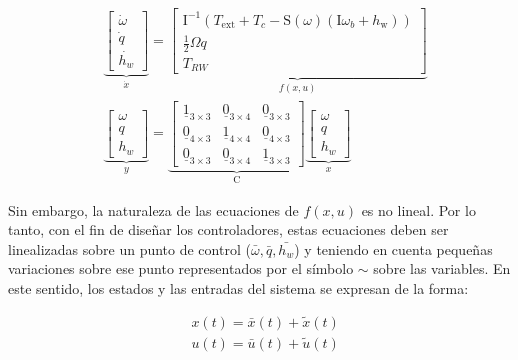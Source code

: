 \begin{equation}\label{eq:espacio_estados_non}
	\begin{aligned}
		& \underbrace{\left[\begin{array}{c}
				\dot{\omega} \\
				\dot{q} \\
				\dot{h_{w}}
			\end{array}\right]}_{\dot{x}}=\underbrace{\left[\begin{array}{c}
				{\mathrm{I}}^{-1}\left(T_{\mathrm{ext}}+T_{c}-{\mathrm{S}}(\omega)\left({\mathrm{I}} \omega_{b}+h_{\mathrm{w}}\right)\right) \\
				\frac{1}{2} {\Omega} q \\
				T_{RW}
			\end{array}\right]}_{f(x,u)}\\[10pt]
		& \underbrace{\left[\begin{array}{c}
				\omega \\
				q \\
				h_{w}
			\end{array}\right]}_y=\underbrace{\left[\begin{array}{ccc}
				\underline{1}_{3 \times 3} & \underline{0}_{3 \times 4} & \underline{0}_{3 \times 3}\\
				\underline{0}_{4 \times 3} & \underline{1}_{4 \times 4} & \underline{0}_{4 \times 3} \\
				\underline{0}_{3 \times 3} & \underline{0}_{3 \times 4} & \underline{1}_{3 \times 3}
			\end{array}\right]}_{{\mathrm{C}}} \underbrace{\left[\begin{array}{c}
				\omega \\
				q \\
				h_{w}
			\end{array}\right]}_x
	\end{aligned}	
\end{equation}

Sin embargo, la naturaleza de las ecuaciones de $f(x,u)$ es no lineal. Por lo tanto, con el fin de diseñar los controladores, estas ecuaciones deben ser linealizadas sobre un punto de control ($\bar{\omega},\bar{q},\bar{h_w}$) y teniendo en cuenta pequeñas variaciones sobre ese punto representados por el símbolo $\sim$ sobre las variables. En este sentido, los estados y las entradas del sistema se expresan de la forma: 

\begin{equation}
	\begin{aligned}
		& x(t) =\bar{x}(t)+ \tilde{x}(t) \\
		& u(t) =\bar{u}(t)+ \tilde{u}(t) 		
	\end{aligned}
\end{equation}	

